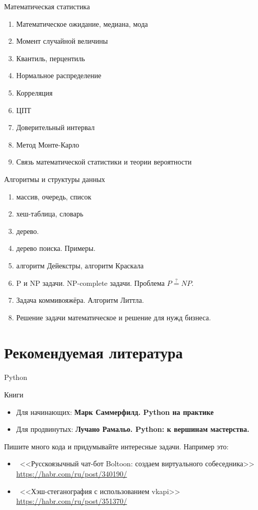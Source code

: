 \documentclass{beamer}
\newcommand{\рис}[1]{рис.\ref{#1}}
\newcommand{\Рис}[1]{Рис.\ref{#1}}
\newcommand{\таблицa}[1]{таблица~№\ref{#1}} %
\newcommand{\таблицы}[1]{таблицы~№\ref{#1}} %
\newcommand{\таблице}[1]{таблице~№\ref{#1}} %
\newcommand{\таблицу}[1]{таблицу~№\ref{#1}} %
\newcommand{\таблицей}[1]{таблицей~№\ref{#1}} %
\newcommand{\Таблицa}[1]{Таблица~№\ref{#1}} %
\newcommand{\Таблицы}[1]{Таблицы~№\ref{#1}} %
\newcommand{\Таблице}[1]{Таблице~№\ref{#1}} %
\newcommand{\Таблицу}[1]{Таблицу~№\ref{#1}} %
\newcommand{\Таблицей}[1]{Таблицей~№\ref{#1}} %
\begin{document}
  \begin{frame}{Математическая статистика}
  \begin{enumerate}
    \item Математическое ожидание, медиана, мода
    \item Момент случайной величины
    \item Квантиль, перцентиль
    \item Нормальное распределение
    \item Корреляция
    \item ЦПТ
    \item Доверительный интервал
    \item Метод Монте-Карло
    \item Связь математической статистики и теории вероятности
 \end{enumerate}  
\end{frame}

  \begin{frame}{Алгоритмы и структуры данных}
   \begin{enumerate}
   	
     \item массив, очередь, список
     \item хеш-таблица, словарь
     \item дерево.
     \item дерево поиска. Примеры.
     \item алгоритм Дейекстры, алгоритм Краскала
     \item P и NP задачи. NP-complete задачи. Проблема $ P\stackrel{?}{=} NP$.
     \item Задача коммивояжёра. Алгоритм Литтла.  
     \item Решение задачи математическое и решение для нужд бизнеса.   
	\end{enumerate}
	\end{frame}
  
  \section{Рекомендуемая литература}\label{section:literature}
  
  \begin{frame}{Python}
  
  Книги
  \begin{itemize}
  	\item Для начинающих: 
  	\textbf{Марк Саммерфилд. Python на практике} 
  	\item 
  	Для продвинутых:
  	\textbf{Лучано Рамальо. Python: к вершинам мастерства.}
  \end{itemize}
  
  Пишите много кода и придумывайте интересные задачи. 
  Например это:
  \begin{itemize}
  	\item ~<<Русскоязычный чат-бот Boltoon: создаем виртуального собеседника>>
  	\url{https://habr.com/ru/post/340190/}
  	\item ~<<Хэш-стеганография с использованием vkapi>>
  	\url{https://habr.com/ru/post/351370/}
  \end{itemize}
\end{frame}
	
\end{document}
